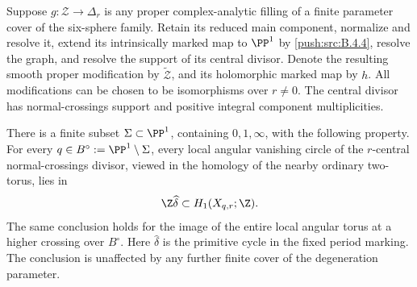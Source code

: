 \begin{proposition}\hypertarget{tag-0311}{}\label{push:src:B.4.31}

Suppose $g:\mathcal Z\to\Delta_r$ is any proper complex-analytic
filling of a finite parameter cover of the six-sphere
family. Retain its reduced main component, normalize and resolve
it, extend its intrinsically marked map to $\PP^1$ by \ref{push:src:B.4.4},
resolve the graph, and resolve the support of its central divisor. Denote
the resulting smooth proper modification by $\widetilde{\mathcal Z}$,
and its holomorphic marked map by $h$. All modifications can be
chosen to be isomorphisms over $r\ne0$. The central divisor has normal-crossings support and positive integral
component multiplicities.

There is a finite subset $\Sigma\subset\PP^1$, containing
$0,1,\infty$, with the following property. For every
$q\in B^\circ:=\PP^1\setminus\Sigma$, every local angular
vanishing circle of the $r$-central normal-crossings divisor,
viewed in the homology of the nearby ordinary two-torus, lies in
\begin{equation}
             \Z\widehat\delta\subset H_1(X_{q,r};\Z).
\label{pub:I:eq:B-4-31-1}
\end{equation}
The same conclusion holds for the image of the entire local
angular torus at a higher crossing over $B^\circ$.
Here $\widehat\delta$ is the primitive cycle in the fixed
period marking. The conclusion is unaffected by any further
finite cover of the degeneration parameter.


\end{proposition}


